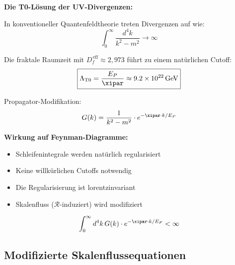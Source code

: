 	\begin{anwendung}
		\textbf{Die T0-Lösung der UV-Divergenzen:}
		
		In konventioneller Quantenfeldtheorie treten Divergenzen auf wie:
		\begin{equation}
			\int_0^\infty \frac{d^4k}{k^2 - m^2} \to \infty
		\end{equation}
		
		Die fraktale Raumzeit mit $D_f^{\,\text{eff}} \approx 2{,}973$ führt zu einem natürlichen Cutoff:
		\begin{equation}
			\boxed{\Lambda_{\text{T0}} = \frac{E_P}{\xipar} \approx 9.2 \times 10^{22}\, \text{GeV}}
		\end{equation}

		
		Propagator-Modifikation:
		\begin{equation}
			G(k) = \frac{1}{k^2 - m^2} \cdot e^{-\xipar \cdot k/E_P}
		\end{equation}
		
		\textbf{Wirkung auf Feynman-Diagramme:}
		\begin{itemize}
			\item Schleifenintegrale werden natürlich regularisiert
			\item Keine willkürlichen Cutoffs notwendig
			\item Die Regularisierung ist lorentzinvariant
			\item Skalenfluss ($\mathcal{R}$-induziert) wird modifiziert
		\end{itemize}
		
		\begin{equation}
			\int_0^\infty d^4k\, G(k) \cdot e^{-\xipar \cdot k/E_P} < \infty
		\end{equation}
	\end{anwendung}
	
	\subsection{Modifizierte Skalenflussequationen}
	
